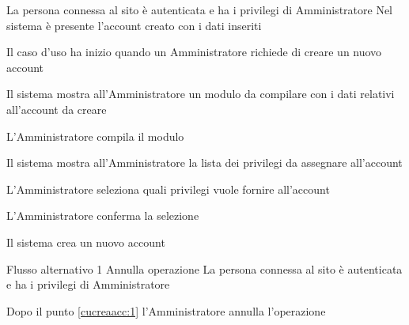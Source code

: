 {}
{La persona connessa al sito è autenticata e ha i privilegi di Amministratore}
{Nel sistema è presente l'account creato con i dati inseriti}
{\begin{enumCU}
	\item Il caso d'uso ha inizio quando un Amministratore richiede di creare un nuovo account
	\item Il sistema mostra all'Amministratore un modulo da compilare con i dati relativi all'account da creare
	\item L'Amministratore compila il modulo
	\item Il sistema mostra all'Amministratore la lista dei privilegi da assegnare all'account
	\item L'Amministratore seleziona quali privilegi vuole fornire all'account\label{cucreaacc:1}
	\item L'Amministratore conferma la selezione
	\item Il sistema crea un nuovo account
\end{enumCU}}
%
{Flusso alternativo 1}%
{Annulla operazione}%
{La persona connessa al sito è autenticata e ha i privilegi di Amministratore}%
{\postNulle}%
{\begin{enumCU}
		\item Dopo il punto \ref{cucreaacc:1} l'Amministratore annulla l'operazione
	\end{enumCU}}%

